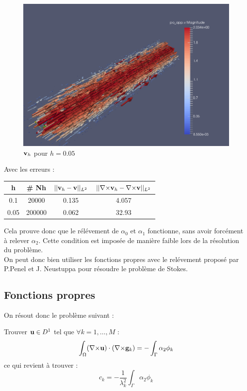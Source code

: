 \documentclass[a4paper,11pt]{article}
\begin{document}
\begin{figure}[H]
  \centering
  \includegraphics[scale=0.4]{vharrow}
  \caption{${\mathbf{v}}_h$ pour $h=0.05$}
\end{figure}

Avec les erreurs :
\begin{table}[H]
  \centering
  \begin{tabular}{c|c||c|c}
    h & \# Nh & $||{\mathbf{v}}_h-{\mathbf{v}}||_{L^2}$ & $||{\nabla\times}{\mathbf{v}}_h-{\nabla\times}{\mathbf{v}}||_{L^2}$ \\
    \hline
    0.1 & 20000 & 0.135 & 4.057\\
    0.05 & 200000 & 0.062 & 32.93
  \end{tabular}
\end{table}

Cela prouve donc que le rélévement de $\alpha_0$ et $\alpha_1$ fonctionne, sans avoir forcément à relever $\alpha_2$. Cette condition est imposée de manière faible lors de la résolution du problème.\\
On peut donc bien utiliser les fonctions propres avec le relévement proposé par P.Penel et J. Neustuppa pour résoudre le problème de Stokes.

\subsection{Fonctions propres}
On résout donc le problème suivant :
\begin{pb}Trouver ${\mathbf{u}}\in D^1$ tel que $\forall k=1,\dots,M$ :
  \[ \int_\Omega({\nabla\times}{\mathbf{u}})\cdot({\nabla\times}{\mathbf{g}}_k) = - \int_\Gamma \alpha_2\phi_k \]
  ce qui revient à trouver :
  \[ c_k = -\frac{1}{\lambda_k^2}\int_\Gamma \alpha_2\phi_k \]
\end{pb}
\end{document}
